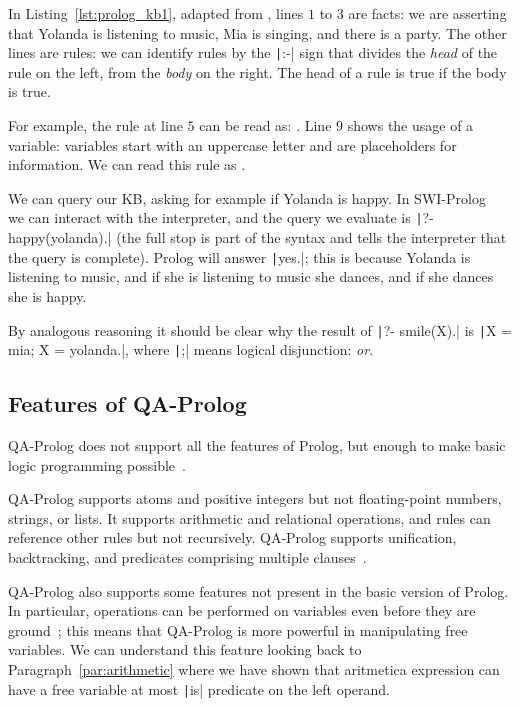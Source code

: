 In Listing~\ref{lst:prolog_kb1}, adapted from \cite{learn_prolog_now_online}, lines $1$ to $3$ are facts: we are asserting that Yolanda is listening to music, Mia is singing, and there is a party. The other lines are rules: we can identify rules by the \texttt|:-| sign that divides the \emph{head} of the rule on the left, from the \emph{body} on the right. The head of a rule is true if the body is true.

For example, the rule at line $5$ can be read as: . Line $9$ shows the usage of a variable: variables start with an uppercase letter and are placeholders for information. We can read this rule as .

We can query our KB, asking for example if Yolanda is happy. In SWI-Prolog~\cite{wielemaker2011tplp} we can interact with the interpreter, and the query we evaluate is \texttt|?- happy(yolanda).| (the full stop is part of the syntax and tells the interpreter that the query is complete). Prolog will answer \texttt|yes.|; this is because Yolanda is listening to music, and if she is listening to music she dances, and if she dances she is happy.

By analogous reasoning it should be clear why the result of \texttt|?- smile(X).| is \texttt|X = mia; X = yolanda.|, where \texttt|;| means logical disjunction: \emph{or}.

\subsection{Features of QA-Prolog}
\label{sec:feature_qa_p}
QA-Prolog does not support all the features of Prolog, but enough to make basic logic programming possible~\cite{pakin2018performing}.

QA-Prolog supports atoms and positive integers but not floating-point numbers, strings, or lists. It supports arithmetic and relational operations, and rules can reference other rules but not recursively. QA-Prolog supports unification, backtracking, and predicates comprising multiple clauses~\cite{pakin2018performing}.

QA-Prolog also supports some features not present in the basic version of Prolog. In particular, operations can be performed on variables even before they are ground~\cite{pakin2018performing}; this means that QA-Prolog is more powerful in manipulating free variables.  We can understand this feature looking back to Paragraph~\ref{par:arithmetic} where we have shown that aritmetica expression can have a free variable at most \textemdash{}\texttt|is| predicate\textemdash{} on the left operand. 


